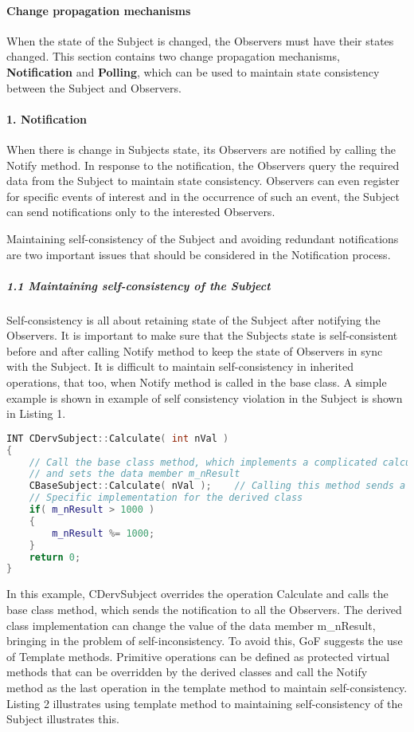 \documentclass{book}
\begin{document}
\paragraph{Change propagation mechanisms}

When the state of the Subject is changed, the Observers must have their states changed.
This section contains two change propagation mechanisms, \textbf{Notification} and \textbf{Polling}, which can be used to maintain state consistency between the Subject and Observers.

\paragraph{1. Notification}

When there is change in Subjects state, its Observers are notified by calling the Notify method.
In response to the notification, the Observers query the required data from the Subject to maintain state consistency.
Observers can even register for specific events of interest and in the occurrence of such an event, the Subject can send notifications only to the interested Observers.

Maintaining self-consistency of the Subject and avoiding redundant notifications are two important issues that should be considered in the Notification process.

\subparagraph{1.1 Maintaining self-consistency of the Subject}

Self-consistency is all about retaining state of the Subject after notifying the Observers.
It is important to make sure that the Subjects state is self-consistent before and after calling Notify method to keep the state of Observers in sync with the Subject.
It is difficult to maintain self-consistency in inherited operations, that too, when Notify method is called in the base class.
A simple example is shown in example of self consistency violation in the Subject is shown in Listing 1.
\begin{lstlisting}[caption={Observer Pattern example, Listing 1 - Self consistency violation in the Subject},language=C++]
INT CDervSubject::Calculate( int nVal )
{
	// Call the base class method, which implements a complicated calculation algorithm
	// and sets the data member m_nResult
	CBaseSubject::Calculate( nVal );	// Calling this method sends a notification to the Observers
	// Specific implementation for the derived class
	if( m_nResult > 1000 )
	{
		m_nResult %= 1000;
	}
	return 0;
}
\end{lstlisting}
In this example, CDervSubject overrides the operation Calculate and calls the base class method, which sends the notification to all the Observers.
The derived class implementation can change the value of the data member m\_nResult, bringing in the problem of self-inconsistency.
To avoid this, GoF suggests the use of Template methods.
Primitive operations can be defined as protected virtual methods that can be overridden by the derived classes and
call the Notify method as the last operation in the template method to maintain self-consistency.
Listing 2 illustrates using template method to maintaining self-consistency of the Subject illustrates this.
\end{document}
